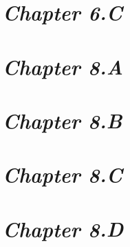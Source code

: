 \documentclass[a4paper,12pt]{article}
\begin{document}
    \newpage

    \section{\large \textit{Chapter 6.C}}

    

    \newpage

    \section{\large \textit{Chapter 8.A}}

    

    \newpage

    \section{\large \textit{Chapter 8.B}}

    

    \newpage

    \section{\large \textit{Chapter 8.C}}

    

    \newpage

    \section{\large \textit{Chapter 8.D}}

    
\end{document}
